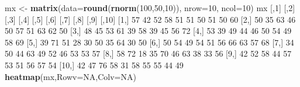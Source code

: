 \documentclass[]{book}
\newenvironment{Shaded}{\begin{snugshade}}{\end{snugshade}}
\newcommand{\DataTypeTok}[1]{\textcolor[rgb]{0.13,0.29,0.53}{#1}}
\newcommand{\DecValTok}[1]{\textcolor[rgb]{0.00,0.00,0.81}{#1}}
\newcommand{\KeywordTok}[1]{\textcolor[rgb]{0.13,0.29,0.53}{\textbf{#1}}}
\newcommand{\NormalTok}[1]{#1}
\newcommand{\OtherTok}[1]{\textcolor[rgb]{0.56,0.35,0.01}{#1}}
\newcommand{\StringTok}[1]{\textcolor[rgb]{0.31,0.60,0.02}{#1}}
\begin{document}
\begin{Shaded}
\begin{Highlighting}[]
\NormalTok{mx <-}\StringTok{ }\KeywordTok{matrix}\NormalTok{(}\DataTypeTok{data=}\KeywordTok{round}\NormalTok{(}\KeywordTok{rnorm}\NormalTok{(}\DecValTok{100}\NormalTok{,}\DecValTok{50}\NormalTok{,}\DecValTok{10}\NormalTok{)),}
             \DataTypeTok{nrow=}\DecValTok{10}\NormalTok{,}
             \DataTypeTok{ncol=}\DecValTok{10}\NormalTok{)}
\NormalTok{mx}
\NormalTok{      [,}\DecValTok{1}\NormalTok{] [,}\DecValTok{2}\NormalTok{] [,}\DecValTok{3}\NormalTok{] [,}\DecValTok{4}\NormalTok{] [,}\DecValTok{5}\NormalTok{] [,}\DecValTok{6}\NormalTok{] [,}\DecValTok{7}\NormalTok{] [,}\DecValTok{8}\NormalTok{] [,}\DecValTok{9}\NormalTok{] [,}\DecValTok{10}\NormalTok{]}
\NormalTok{ [}\DecValTok{1}\NormalTok{,]   }\DecValTok{57}   \DecValTok{42}   \DecValTok{52}   \DecValTok{58}   \DecValTok{51}   \DecValTok{51}   \DecValTok{50}   \DecValTok{51}   \DecValTok{50}    \DecValTok{60}
\NormalTok{ [}\DecValTok{2}\NormalTok{,]   }\DecValTok{50}   \DecValTok{35}   \DecValTok{63}   \DecValTok{46}   \DecValTok{50}   \DecValTok{57}   \DecValTok{51}   \DecValTok{63}   \DecValTok{62}    \DecValTok{50}
\NormalTok{ [}\DecValTok{3}\NormalTok{,]   }\DecValTok{48}   \DecValTok{45}   \DecValTok{53}   \DecValTok{61}   \DecValTok{39}   \DecValTok{58}   \DecValTok{39}   \DecValTok{45}   \DecValTok{56}    \DecValTok{72}
\NormalTok{ [}\DecValTok{4}\NormalTok{,]   }\DecValTok{53}   \DecValTok{39}   \DecValTok{49}   \DecValTok{44}   \DecValTok{46}   \DecValTok{50}   \DecValTok{54}   \DecValTok{49}   \DecValTok{58}    \DecValTok{69}
\NormalTok{ [}\DecValTok{5}\NormalTok{,]   }\DecValTok{39}   \DecValTok{71}   \DecValTok{51}   \DecValTok{28}   \DecValTok{30}   \DecValTok{50}   \DecValTok{35}   \DecValTok{64}   \DecValTok{30}    \DecValTok{50}
\NormalTok{ [}\DecValTok{6}\NormalTok{,]   }\DecValTok{50}   \DecValTok{54}   \DecValTok{49}   \DecValTok{54}   \DecValTok{51}   \DecValTok{56}   \DecValTok{66}   \DecValTok{63}   \DecValTok{57}    \DecValTok{68}
\NormalTok{ [}\DecValTok{7}\NormalTok{,]   }\DecValTok{34}   \DecValTok{50}   \DecValTok{44}   \DecValTok{63}   \DecValTok{49}   \DecValTok{52}   \DecValTok{46}   \DecValTok{53}   \DecValTok{53}    \DecValTok{57}
\NormalTok{ [}\DecValTok{8}\NormalTok{,]   }\DecValTok{58}   \DecValTok{72}   \DecValTok{18}   \DecValTok{35}   \DecValTok{70}   \DecValTok{46}   \DecValTok{63}   \DecValTok{38}   \DecValTok{33}    \DecValTok{56}
\NormalTok{ [}\DecValTok{9}\NormalTok{,]   }\DecValTok{42}   \DecValTok{52}   \DecValTok{58}   \DecValTok{44}   \DecValTok{57}   \DecValTok{53}   \DecValTok{51}   \DecValTok{56}   \DecValTok{57}    \DecValTok{54}
\NormalTok{[}\DecValTok{10}\NormalTok{,]   }\DecValTok{42}   \DecValTok{47}   \DecValTok{76}   \DecValTok{58}   \DecValTok{31}   \DecValTok{58}   \DecValTok{55}   \DecValTok{55}   \DecValTok{44}    \DecValTok{49}
\KeywordTok{heatmap}\NormalTok{(mx,}\DataTypeTok{Rowv=}\OtherTok{NA}\NormalTok{,}\DataTypeTok{Colv=}\OtherTok{NA}\NormalTok{)}
\end{Highlighting}
\end{Shaded}
\end{document}
